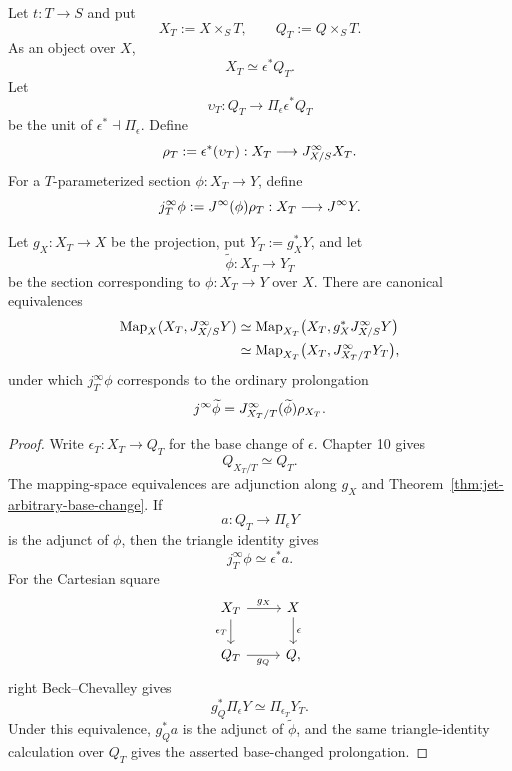 \begin{construction}
\label{con:parameterized-terminal-coalgebra}
Let $t:T\to S$ and put
\[
    X_T:=X\times_ST,
    \qquad
    Q_T:=Q\times_ST.
\]
As an object over $X$,
\[
    X_T\simeq\epsilon^*Q_T.
\]
Let
\[
    \upsilon_T:Q_T\longrightarrow\Pi_\epsilon\epsilon^*Q_T
\]
be the unit of $\epsilon^*\dashv\Pi_\epsilon$.  Define
\[
    \rho_T:=\epsilon^*(\upsilon_T):
    X_T\longrightarrow J^{\infty}_{X/S}X_T.
\]
For a $T$-parameterized section $\phi:X_T\to Y$, define
\[
    j_T^\infty\phi:=J^{\infty}(\phi)\rho_T:
    X_T\longrightarrow J^{\infty} Y.
\]
\end{construction}

\begin{proposition}
\label{prop:parameterized-jet-base-change}
Let $g_X:X_T\to X$ be the projection, put $Y_T:=g_X^*Y$, and let
\[
    \widetilde\phi:X_T\longrightarrow Y_T
\]
be the section corresponding to $\phi:X_T\to Y$ over $X$.  There are canonical equivalences
\[
\begin{aligned}
\operatorname{Map}_X(X_T,J^{\infty}_{X/S}Y)
&\simeq
\operatorname{Map}_{X_T}\bigl(X_T,g_X^*J^{\infty}_{X/S}Y\bigr)\\
&\simeq
\operatorname{Map}_{X_T}\bigl(X_T,J^{\infty}_{X_T/T}Y_T\bigr),
\end{aligned}
\]
under which $j_T^\infty\phi$ corresponds to the ordinary prolongation
\[
    j^\infty\widetilde\phi
    =
    J^{\infty}_{X_T/T}(\widetilde\phi)\rho_{X_T}.
\]
\end{proposition}

\begin{proof}
Write $\epsilon_T:X_T\to Q_T$ for the base change of $\epsilon$.  Chapter 10 gives
\[
    Q_{X_T/T}\simeq Q_T.
\]
The mapping-space equivalences are adjunction along $g_X$ and Theorem~\ref{thm:jet-arbitrary-base-change}.  If
\[
    a:Q_T\longrightarrow\Pi_\epsilon Y
\]
is the adjunct of $\phi$, then the triangle identity gives
\[
    j_T^\infty\phi\simeq\epsilon^*a.
\]
For the Cartesian square
\[
\begin{tikzcd}
X_T \arrow[r,"g_X"] \arrow[d,"\epsilon_T"']
& X \arrow[d,"\epsilon"]
\\
Q_T \arrow[r,"g_Q"']
& Q,
\end{tikzcd}
\]
right Beck--Chevalley gives
\[
    g_Q^*\Pi_\epsilon Y\simeq\Pi_{\epsilon_T}Y_T.
\]
Under this equivalence, $g_Q^*a$ is the adjunct of $\widetilde\phi$, and the same triangle-identity calculation over $Q_T$ gives the asserted base-changed prolongation.
\end{proof}

